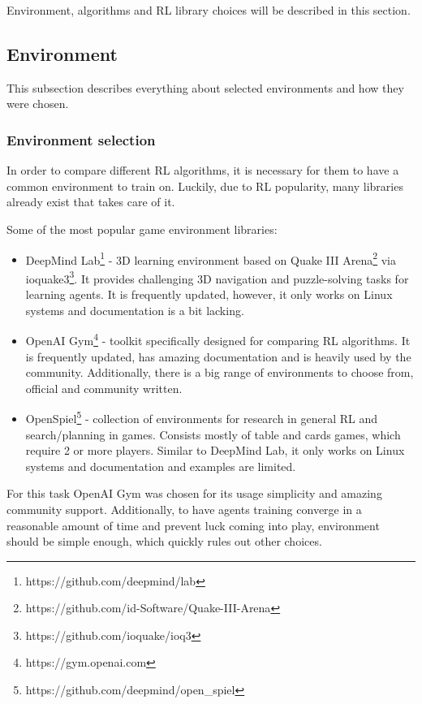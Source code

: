 \documentclass[12pt, a4paper]{article}
\begin{document}
Environment, algorithms and RL library choices will be described in this section.

\subsection{Environment}

This subsection describes everything about selected environments and how they were chosen.

\subsubsection{Environment selection}

In order to compare different RL algorithms, it is necessary for them to have a common environment to train on. Luckily, due to RL popularity, many libraries already exist that takes care of it.

Some of the most popular game environment libraries:
\begin{itemize}
  \item DeepMind Lab\footnote{https://github.com/deepmind/lab} \cite{beattie:2016} - 3D learning environment based on Quake III Arena\footnote{https://github.com/id-Software/Quake-III-Arena} via ioquake3\footnote{https://github.com/ioquake/ioq3}. It provides challenging 3D navigation and puzzle-solving tasks for learning agents. It is frequently updated, however, it only works on Linux systems and documentation is a bit lacking.
  \item OpenAI Gym\footnote{https://gym.openai.com} \cite{1606.01540} - toolkit specifically designed for comparing RL algorithms. It is frequently updated, has amazing documentation and is heavily used by the community. Additionally, there is a big range of environments to choose from, official and community written.
  \item OpenSpiel\footnote{https://github.com/deepmind/open\_spiel} \cite{LanctotEtAl2019OpenSpiel} - collection of environments for research in general RL and search/planning in games. Consists mostly of table and cards games, which require 2 or more players. Similar to DeepMind Lab, it only works on Linux systems and documentation and examples are limited.
\end{itemize}

For this task OpenAI Gym was chosen for its usage simplicity and amazing community support.
Additionally, to have agents training converge in a reasonable amount of time and prevent luck coming into play, environment should be simple enough, which quickly rules out other choices.
\end{document}
